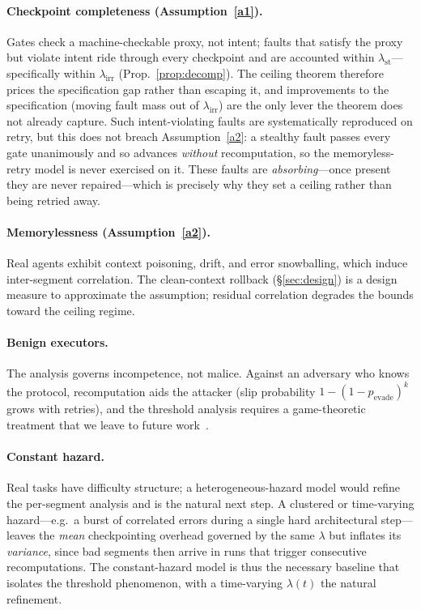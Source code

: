 \documentclass[11pt]{article}
\theoremstyle{remark}
\newcommand{\lst}{\lambda_{\mathrm{st}}}
\newcommand{\lirr}{\lambda_{\mathrm{irr}}}
\begin{document}
\paragraph{Checkpoint completeness (Assumption~\ref{a1}).} Gates check a machine-checkable proxy,
not intent; faults that satisfy the proxy but violate intent ride through every checkpoint and are
accounted within $\lst$---specifically within $\lirr$ (Prop.~\ref{prop:decomp}).
The ceiling
theorem therefore prices the specification gap rather than escaping it, and improvements to the
specification (moving fault mass out of $\lirr$) are the only lever the theorem does not already
capture.
Such intent-violating faults are systematically reproduced on retry, but this does not breach
Assumption~\ref{a2}: a stealthy fault passes every gate unanimously and so advances \emph{without}
recomputation, so the memoryless-retry model is never exercised on it.
These faults are \emph{absorbing}---once present they are never repaired---which is precisely why
they set a ceiling rather than being retried away.
\paragraph{Memorylessness (Assumption~\ref{a2}).} Real agents exhibit context poisoning, drift,
and error snowballing, which induce inter-segment correlation.
The clean-context rollback
(\S\ref{sec:design}) is a design measure to approximate the assumption; residual correlation
degrades the bounds toward the ceiling regime.
\paragraph{Benign executors.} The analysis governs incompetence, not malice. Against an adversary
who knows the protocol, recomputation aids the attacker (slip probability $1-(1-p_{\mathrm{evade}})^k$
grows with retries), and the threshold analysis requires a game-theoretic treatment that we leave
to future work~\cite{greenblatt2024}.
\paragraph{Constant hazard.} Real tasks have difficulty structure; a heterogeneous-hazard model
would refine the per-segment analysis and is the natural next step.
A clustered or time-varying
hazard---e.g.\ a burst of correlated errors during a single hard architectural step---leaves the
\emph{mean} checkpointing overhead governed by the same $\lambda$ but inflates its \emph{variance},
since bad segments then arrive in runs that trigger consecutive recomputations.
The constant-hazard
model is thus the necessary baseline that isolates the threshold phenomenon, with a time-varying
$\lambda(t)$ the natural refinement.
\end{document}
